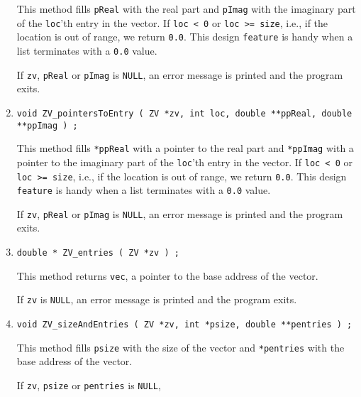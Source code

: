 \begin{enumerate}
\begin{verbatim}
\end{verbatim}
This method fills {\tt *pReal} with the real part and
{\tt *pImag} with the imaginary part of the {\tt loc}'th entry
in the vector.
If {\tt loc < 0} or {\tt loc >= size}, i.e., if the location is
out of range, we return {\tt 0.0}.
This design {\tt feature} is handy when a list terminates with a
{\tt 0.0} value.
\par {}
If {\tt zv}, {\tt pReal} or {\tt pImag} is {\tt NULL},
an error message is printed and the program exits.
\item
\begin{verbatim}
void ZV_pointersToEntry ( ZV *zv, int loc, double **ppReal, double **ppImag ) ;
\end{verbatim}
This method fills {\tt **ppReal} with a pointer to the real part and
{\tt **ppImag} with a pointer to the imaginary part 
of the {\tt loc}'th entry in the vector.
If {\tt loc < 0} or {\tt loc >= size}, i.e., if the location is
out of range, we return {\tt 0.0}.
This design {\tt feature} is handy when a list terminates with a
{\tt 0.0} value.
\par {}
If {\tt zv}, {\tt pReal} or {\tt pImag} is {\tt NULL},
an error message is printed and the program exits.
\item
\begin{verbatim}
double * ZV_entries ( ZV *zv ) ;
\end{verbatim}
This method returns {\tt vec},
a pointer to the base address of the vector.
\par {}
If {\tt zv} is {\tt NULL},
an error message is printed and the program exits.
\item
\begin{verbatim}
void ZV_sizeAndEntries ( ZV *zv, int *psize, double **pentries ) ;
\end{verbatim}
This method fills {\tt *psize} with the size of the vector
and {\tt **pentries} with the base address of the vector.
\par {}
If {\tt zv}, {\tt psize} or {\tt pentries} is {\tt NULL},

\end{enumerate}

